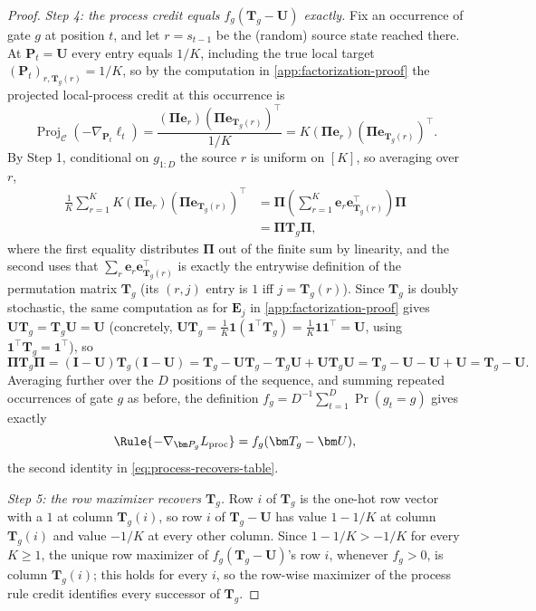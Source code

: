 \begin{proof}
\emph{Step 4: the process credit equals $f_g(\bm T_g-\bm U)$ exactly.} Fix
an occurrence of gate $g$ at position $t$, and let $r=s_{t-1}$ be the
(random) source state reached there. At $\bm P_t=\bm U$ every entry equals
$1/K$, including the true local target $(\bm P_t)_{r,\bm T_g(r)}=1/K$, so by
the computation in \cref{app:factorization-proof} the projected local-process
credit at this occurrence is
\[
 \operatorname{Proj}_{\mathcal C}(-\nabla_{\bm P_t}\ell_t)
 =\frac{(\bm{\Pi} \bm{e}_r)(\bm{\Pi} \bm{e}_{\bm{T}_g(r)})^\top}{1/K}
 =K(\bm{\Pi} \bm{e}_r)(\bm{\Pi} \bm{e}_{\bm{T}_g(r)})^\top.
\]
By Step 1, conditional on $g_{1:D}$ the source $r$ is uniform on $[K]$, so
averaging over $r$,
\begin{align*}
 \frac1K\sum_{r=1}^K K(\bm{\Pi} \bm{e}_r)(\bm{\Pi} \bm{e}_{\bm{T}_g(r)})^\top
 &=\bm{\Pi}\left(\sum_{r=1}^K\bm e_r\bm e_{\bm{T}_g(r)}^\top\right)\bm{\Pi}\\
 &=\bm{\Pi} \bm{T}_g\bm{\Pi},
\end{align*}
where the first equality distributes $\bm\Pi$ out of the finite sum by
linearity, and the second uses that $\sum_r\bm e_r\bm e_{\bm T_g(r)}^\top$ is
exactly the entrywise definition of the permutation matrix $\bm T_g$ (its
$(r,j)$ entry is $1$ iff $j=\bm T_g(r)$). Since $\bm T_g$ is doubly
stochastic, the same computation as for $\bm E_j$ in
\cref{app:factorization-proof} gives $\bm U\bm T_g=\bm T_g\bm U=\bm U$
(concretely, $\bm U\bm T_g=\tfrac1K\mathbf1(\mathbf1^\top\bm T_g)=\tfrac1K\mathbf1\mathbf1^\top=\bm U$,
using $\mathbf1^\top\bm T_g=\mathbf1^\top$), so
\[
 \bm\Pi\bm T_g\bm\Pi=(\bm I-\bm U)\bm T_g(\bm I-\bm U)
 =\bm T_g-\bm U\bm T_g-\bm T_g\bm U+\bm U\bm T_g\bm U
 =\bm T_g-\bm U-\bm U+\bm U=\bm T_g-\bm U.
\]
Averaging further over the $D$ positions of the sequence, and summing
repeated occurrences of gate $g$ as before, the definition
$f_g=D^{-1}\sum_{t=1}^D\Pr(g_t=g)$ gives exactly
\[
 \Rule{-\nabla_{\bm P_g}L_{\rm proc}}=f_g(\bm T_g-\bm U),
\]
the second identity in \cref{eq:process-recovers-table}.

\emph{Step 5: the row maximizer recovers $\bm T_g$.} Row $i$ of $\bm T_g$ is
the one-hot row vector with a $1$ at column $\bm T_g(i)$, so row $i$ of
$\bm T_g-\bm U$ has value $1-1/K$ at column $\bm T_g(i)$ and value $-1/K$ at
every other column. Since $1-1/K>-1/K$ for every $K\ge1$, the unique row
maximizer of $f_g(\bm T_g-\bm U)$'s row $i$, whenever $f_g>0$, is column
$\bm T_g(i)$; this holds for every $i$, so the row-wise maximizer of the
process rule credit identifies every successor of $\bm T_g$.
\end{proof}

